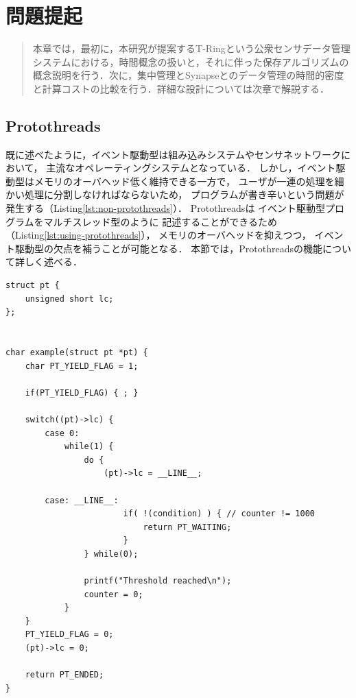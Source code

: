 \chapter{問題提起}
\begin{large}
\begin{quote}
本章では，最初に，本研究が提案するT-Ringという公衆センサデータ管理システムにおける，時間概念の扱いと，それに伴った保存アルゴリズムの概念説明を行う．次に，集中管理とSynapseとのデータ管理の時間的密度と計算コストの比較を行う．詳細な設計については次章で解説する．

\end{quote}
\end{large}
\clearpage

\section{Protothreads}\label{sec:protothreads}
既に述べたように，イベント駆動型は組み込みシステムやセンサネットワークにおいて，
主流なオペレーティングシステムとなっている．
しかし，イベント駆動型はメモリのオーバヘッド低く維持できる一方で，
ユーザが一連の処理を細かい処理に分割しなければならないため，
プログラムが書き辛いという問題が発生する（Listing\ref{lst:non-protothreads}）．
Protothreads\cite{Dunkels:2006:PSE:1182807.1182811}は
イベント駆動型プログラムをマルチスレッド型のように
記述することができるため（Listing\ref{lst:using-protothreads}），
メモリのオーバヘッドを抑えつつ，
イベント駆動型の欠点を補うことが可能となる．
本節では，Protothreadsの機能について詳しく述べる．



\begin{lstlisting}[caption=Protothredsを使用せずに記述した場合, label={lst:non-protothreads}]
struct pt {
    unsigned short lc;
};


char example(struct pt *pt) { 
    char PT_YIELD_FLAG = 1;

    if(PT_YIELD_FLAG) { ; }

    switch((pt)->lc) {
        case 0:
            while(1) { 
                do {
                    (pt)->lc = __LINE__;

        case: __LINE__:
                        if( !(condition) ) { // counter != 1000
                            return PT_WAITING;
                        } 
                } while(0);

                printf("Threshold reached\n");
                counter = 0;
            } 
    }
    PT_YIELD_FLAG = 0;
    (pt)->lc = 0;

    return PT_ENDED;
}
\end{lstlisting}



